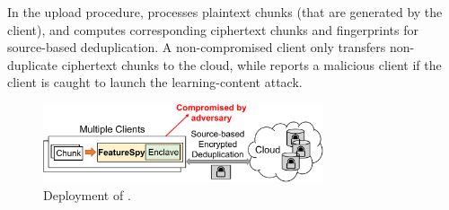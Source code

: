 In the upload procedure, \sysnameF processes plaintext chunks (that are generated by the client), and computes corresponding ciphertext chunks and fingerprints for source-based deduplication. A non-compromised client only transfers non-duplicate ciphertext chunks to the cloud, while \sysnameF reports a malicious client if the client is caught to launch the learning-content attack.

\begin{figure}
  \centering
  \includegraphics[width=3.25in]{pic/featurespy/deployment.pdf}
  \vspace{-6pt}
  \caption{Deployment of \sysnameF.}
  \label{fig:model}
  \vspace{-6pt}
\end{figure}





%



